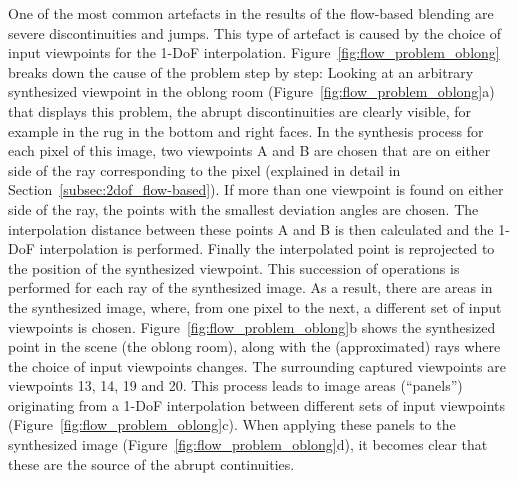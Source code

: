 One of the most common artefacts in the results of the flow-based blending are severe discontinuities and jumps. This type of artefact is caused by the choice of input viewpoints for the 1-DoF interpolation. Figure~\ref{fig:flow_problem_oblong} breaks down the cause of the problem step by step: Looking at an arbitrary synthesized viewpoint in the oblong room (Figure~\ref{fig:flow_problem_oblong}a) that displays this problem, the abrupt discontinuities are clearly visible, for example in the rug in the bottom and right faces. 
In the synthesis process for each pixel of this image, two viewpoints A and B are chosen that are on either side of the ray corresponding to the pixel (explained in detail in Section~\ref{subsec:2dof_flow-based}). If more than one viewpoint is found on either side of the ray, the points with the smallest deviation angles are chosen. The interpolation distance between these points A and B is then calculated and the 1-DoF interpolation is performed. Finally the interpolated point is reprojected to the position of the synthesized viewpoint.
This succession of operations is performed for each ray of the synthesized image. As a result, there are areas in the synthesized image, where, from one pixel to the next, a different set of input viewpoints is chosen.
Figure~\ref{fig:flow_problem_oblong}b shows the synthesized point in the scene (the oblong room), along with the (approximated) rays where the choice of input viewpoints changes. The surrounding captured viewpoints are viewpoints 13, 14, 19 and 20.
This process leads to image areas (``panels'') originating from a 1-DoF interpolation between different sets of input viewpoints (Figure~\ref{fig:flow_problem_oblong}c). When applying these panels to the synthesized image (Figure~\ref{fig:flow_problem_oblong}d), it becomes clear that these are the source of the abrupt continuities.

